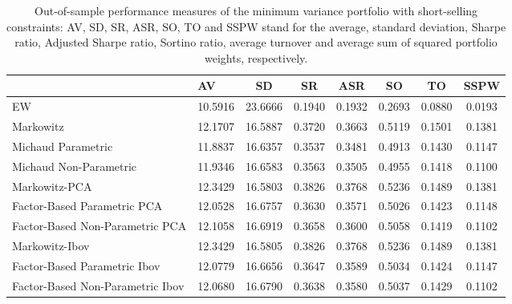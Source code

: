 \begin{table}

\caption{\label{tab:empirical_mvp}Out-of-sample performance measures of the minimum variance portfolio with short-selling constraints: AV, SD, SR, ASR, SO, TO and SSPW stand for the average, standard deviation, Sharpe ratio, Adjusted Sharpe ratio, Sortino ratio, average turnover and average sum of squared portfolio weights, respectively.}
\centering
\begin{tabular}[t]{l|l|c|c|c|c|c|c}
\hline
  & AV & SD & SR & ASR & SO & TO & SSPW\\
\hline
EW & 10.5916 & 23.6666 & 0.1940 & 0.1932 & 0.2693 & 0.0880 & 0.0193\\
\hline
Markowitz & 12.1707 & 16.5887 & 0.3720 & 0.3663 & 0.5119 & 0.1501 & 0.1381\\
\hline
Michaud Parametric & 11.8837 & 16.6357 & 0.3537 & 0.3481 & 0.4913 & 0.1430 & 0.1147\\
\hline
Michaud Non-Parametric & 11.9346 & 16.6583 & 0.3563 & 0.3505 & 0.4955 & 0.1418 & 0.1100\\
\hline
Markowitz-PCA & 12.3429 & 16.5803 & 0.3826 & 0.3768 & 0.5236 & 0.1489 & 0.1381\\
\hline
Factor-Based Parametric PCA & 12.0528 & 16.6757 & 0.3630 & 0.3571 & 0.5026 & 0.1423 & 0.1148\\
\hline
Factor-Based Non-Parametric PCA & 12.1058 & 16.6919 & 0.3658 & 0.3600 & 0.5058 & 0.1419 & 0.1102\\
\hline
Markowitz-Ibov & 12.3429 & 16.5805 & 0.3826 & 0.3768 & 0.5236 & 0.1489 & 0.1381\\
\hline
Factor-Based Parametric Ibov & 12.0779 & 16.6656 & 0.3647 & 0.3589 & 0.5034 & 0.1424 & 0.1147\\
\hline
Factor-Based Non-Parametric Ibov & 12.0680 & 16.6790 & 0.3638 & 0.3580 & 0.5037 & 0.1429 & 0.1102\\
\hline
\end{tabular}
\end{table}
